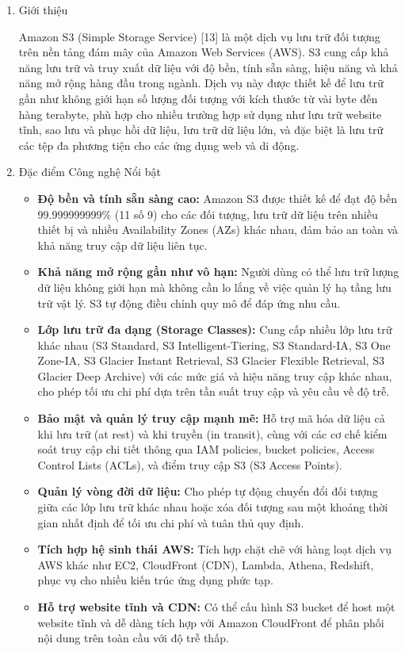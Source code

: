\begin{enumerate}[label=\arabic*., font=\bfseries]
    \item Giới thiệu

    Amazon S3 (Simple Storage Service) [13] là một dịch vụ lưu trữ đối tượng trên nền tảng đám mây của Amazon Web Services (AWS). S3 cung cấp khả năng lưu trữ và truy xuất dữ liệu với độ bền, tính sẵn sàng, hiệu năng và khả năng mở rộng hàng đầu trong ngành. Dịch vụ này được thiết kế để lưu trữ gần như không giới hạn số lượng đối tượng với kích thước từ vài byte đến hàng terabyte, phù hợp cho nhiều trường hợp sử dụng như lưu trữ website tĩnh, sao lưu và phục hồi dữ liệu, lưu trữ dữ liệu lớn, và đặc biệt là lưu trữ các tệp đa phương tiện cho các ứng dụng web và di động.

    \item Đặc điểm Công nghệ Nổi bật
    \begin{itemize}
        \item \textbf{Độ bền và tính sẵn sàng cao:} Amazon S3 được thiết kế để đạt độ bền 99.999999999\% (11 số 9) cho các đối tượng, lưu trữ dữ liệu trên nhiều thiết bị và nhiều Availability Zones (AZs) khác nhau, đảm bảo an toàn và khả năng truy cập dữ liệu liên tục.
        \item \textbf{Khả năng mở rộng gần như vô hạn:} Người dùng có thể lưu trữ lượng dữ liệu không giới hạn mà không cần lo lắng về việc quản lý hạ tầng lưu trữ vật lý. S3 tự động điều chỉnh quy mô để đáp ứng nhu cầu.
        \item \textbf{Lớp lưu trữ đa dạng (Storage Classes):} Cung cấp nhiều lớp lưu trữ khác nhau (S3 Standard, S3 Intelligent-Tiering, S3 Standard-IA, S3 One Zone-IA, S3 Glacier Instant Retrieval, S3 Glacier Flexible Retrieval, S3 Glacier Deep Archive) với các mức giá và hiệu năng truy cập khác nhau, cho phép tối ưu chi phí dựa trên tần suất truy cập và yêu cầu về độ trễ.
        \item \textbf{Bảo mật và quản lý truy cập mạnh mẽ:} Hỗ trợ mã hóa dữ liệu cả khi lưu trữ (at rest) và khi truyền (in transit), cùng với các cơ chế kiểm soát truy cập chi tiết thông qua IAM policies, bucket policies, Access Control Lists (ACLs), và điểm truy cập S3 (S3 Access Points).
        \item \textbf{Quản lý vòng đời dữ liệu:} Cho phép tự động chuyển đổi đối tượng giữa các lớp lưu trữ khác nhau hoặc xóa đối tượng sau một khoảng thời gian nhất định để tối ưu chi phí và tuân thủ quy định.
        \item \textbf{Tích hợp hệ sinh thái AWS:} Tích hợp chặt chẽ với hàng loạt dịch vụ AWS khác như EC2, CloudFront (CDN), Lambda, Athena, Redshift, phục vụ cho nhiều kiến trúc ứng dụng phức tạp.
        \item \textbf{Hỗ trợ website tĩnh và CDN:} Có thể cấu hình S3 bucket để host một website tĩnh và dễ dàng tích hợp với Amazon CloudFront để phân phối nội dung trên toàn cầu với độ trễ thấp.
    \end{itemize}


\end{enumerate}
